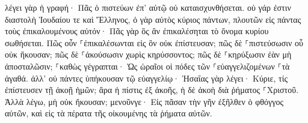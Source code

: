 \documentclass{openreader}
\begin{document}
λέγει γὰρ ἡ γραφή· Πᾶς ὁ πιστεύων ἐπ’ αὐτῷ οὐ καταισχυνθήσεται. 
οὐ γάρ ἐστιν διαστολὴ Ἰουδαίου τε καὶ Ἕλληνος, ὁ γὰρ αὐτὸς κύριος πάντων, πλουτῶν εἰς πάντας τοὺς ἐπικαλουμένους αὐτόν· 
Πᾶς γὰρ ὃς ἂν ἐπικαλέσηται τὸ ὄνομα κυρίου σωθήσεται. 
Πῶς οὖν ⸀ἐπικαλέσωνται εἰς ὃν οὐκ ἐπίστευσαν; πῶς δὲ ⸀πιστεύσωσιν οὗ οὐκ ἤκουσαν; πῶς δὲ ⸀ἀκούσωσιν χωρὶς κηρύσσοντος; 
πῶς δὲ ⸀κηρύξωσιν ἐὰν μὴ ἀποσταλῶσιν; ⸀καθὼς γέγραπται· Ὡς ὡραῖοι οἱ πόδες τῶν ⸀εὐαγγελιζομένων ⸀τὰ ἀγαθά. 
ἀλλ’ οὐ πάντες ὑπήκουσαν τῷ εὐαγγελίῳ· Ἠσαΐας γὰρ λέγει· Κύριε, τίς ἐπίστευσεν τῇ ἀκοῇ ἡμῶν; 
ἄρα ἡ πίστις ἐξ ἀκοῆς, ἡ δὲ ἀκοὴ διὰ ῥήματος ⸀Χριστοῦ. 
Ἀλλὰ λέγω, μὴ οὐκ ἤκουσαν; μενοῦνγε· Εἰς πᾶσαν τὴν γῆν ἐξῆλθεν ὁ φθόγγος αὐτῶν, καὶ εἰς τὰ πέρατα τῆς οἰκουμένης τὰ ῥήματα αὐτῶν. 
\end{document}
